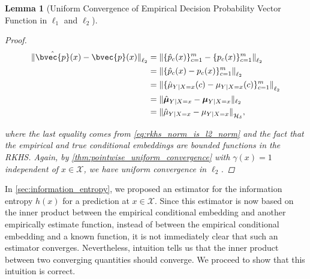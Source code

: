 \documentclass{article}
\newtheorem{lemma}{Lemma}[section]
\begin{document}
\begin{lemma}[Uniform Convergence of Empirical Decision Probability Vector Function in $\ell_{1}$ and $\ell_{2}$]
\begin{proof}
			\begin{equation}
			\begin{aligned}
				{\lVert \hat{\bvec{p}}(x)  - \bvec{p}(x) \rVert}_{\ell_{2}} &= {\lVert \{ \hat{p}_{c}(x) \}_{c = 1}^{m} - \{ p_{c}(x) \}_{c = 1}^{m} \rVert}_{\ell_{2}} \\
				&= {\lVert \{ \hat{p}_{c}(x) - p_{c}(x) \}_{c = 1}^{m} \rVert}_{\ell_{2}} \\
				&= {\lVert \{ \hat{\mu}_{Y | X = x}(c) - \mu_{Y | X = x}(c)\}_{c = 1}^{m} \rVert}_{\ell_{2}} \\
				&= \| \hat{\bm{\mu}}_{Y | X = x} - \bm{\mu}_{Y | X = x}  \|_{\ell_{2}} \\
				&= {\lVert \hat{\mu}_{Y | X = x} - \mu_{Y | X = x}\rVert}_{\mathcal{H}_{\delta}},
			\end{aligned}
			\end{equation}
			
			where the last equality comes from \eqref{eq:rkhs_norm_is_l2_norm} and the fact that the empirical and true conditional embeddings are bounded functions in the RKHS. Again, by \cref{thm:pointwise_uniform_convergence} with $\gamma(x) = 1$ independent of $x \in \mathcal{X}$, we have uniform convergence in $\ell_{2}$.
		\end{proof}
	\end{lemma}
		
	In \cref{sec:information_entropy}, we proposed an estimator for the information entropy $h(x)$ for a prediction at $x \in \mathcal{X}$. Since this estimator is now based on the inner product between the empirical conditional embedding and another empirically estimate function, instead of between the empirical conditional embedding and a known function, it is not immediately clear that such an estimator converges. Nevertheless, intuition tells us that the inner product between two converging quantities should converge. We proceed to show that this intuition is correct.
	
\end{document}
